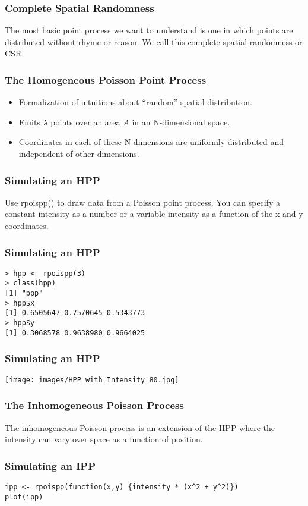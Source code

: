 \documentclass{beamer}
\begin{document}
\frame
{
	\frametitle{Complete Spatial Randomness}

	The most basic point process we want to understand is one in which points are distributed without rhyme or reason. We call this complete spatial randomness or CSR.
}

\frame
{
	\frametitle{The Homogeneous Poisson Point Process}

	\begin{itemize}
		\item<1-> Formalization of intuitions about ``random'' spatial distribution.
		\item<2-> Emits $\lambda$ points over an area $A$ in an N-dimensional space.
		\item<3-> Coordinates in each of these N dimensions are uniformly distributed and independent of other dimensions.
	\end{itemize}
}

\begin{frame}[fragile]
	\frametitle{Simulating an HPP}
	
	Use rpoispp() to draw data from a Poisson point process. You can specify a constant intensity as a number or a variable intensity as a function of the x and y coordinates.
\end{frame}

\begin{frame}[fragile]
	\frametitle{Simulating an HPP}

	\begin{verbatim}
> hpp <- rpoispp(3)
> class(hpp)
[1] "ppp"
> hpp$x
[1] 0.6505647 0.7570645 0.5343773
> hpp$y
[1] 0.3068578 0.9638980 0.9664025
	\end{verbatim}
\end{frame}

\frame
{
	\frametitle{Simulating an HPP}

	\begin{center}
		\texttt{[image: images/HPP\_with\_Intensity\_80.jpg]}
	\end{center}
}

\begin{frame}[fragile]
	\frametitle{The Inhomogeneous Poisson Process}
	
	The inhomogeneous Poisson process is an extension of the HPP where the intensity can vary over space as a function of position.
\end{frame}

\begin{frame}[fragile]
	\frametitle{Simulating an IPP}

	\begin{verbatim}
ipp <- rpoispp(function(x,y) {intensity * (x^2 + y^2)})
plot(ipp)
	\end{verbatim}
\end{frame}
\end{document}
